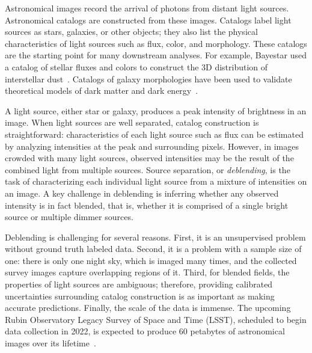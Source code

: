 Astronomical images record the arrival of photons from distant light sources. 
Astronomical catalogs are constructed from these images.
Catalogs label light sources as stars, galaxies, or other objects; they also list the physical characteristics of light sources such as flux, color, and morphology. 
These catalogs are the starting point for many downstream analyses.
For example, Bayestar used a catalog of stellar fluxes and colors to construct the 3D distribution of interstellar dust~\cite{Green_2019_argonaut}. 
Catalogs of galaxy morphologies have been used to validate theoretical models of dark matter and dark energy~\cite{Abbott2018}. 

A light source, either star or galaxy, produces a peak intensity of brightness in an image. 
When light sources are well separated, catalog construction is straightforward: characteristics of each light source such as flux can be estimated by analyzing intensities at the peak and surrounding pixels. 
However, in images crowded with many light sources, observed intensities may be the result of the combined light from multiple sources.
Source separation, or {\itshape deblending}, is the task of characterizing each individual light source from a mixture of intensities on an image. 
A key challenge in deblending is inferring whether any observed intensity is in fact blended, that is, whether it is comprised of a single bright source or multiple dimmer sources. 


Deblending is challenging for several reasons.
First, it is an unsupervised problem without ground truth labeled data. 
Second, it is a problem with a sample size of one: there is only one night sky, which is imaged many times, and the collected survey images capture overlapping regions of it.
Third, for blended fields, the properties of light sources are ambiguous; therefore, providing calibrated uncertainties surrounding catalog construction is as important as making accurate predictions.
Finally, the scale of the data is immense. 
The upcoming Rubin Observatory Legacy Survey of Space and Time (LSST), scheduled to begin data collection in 2022, is expected to produce 60 petabytes of astronomical images over its lifetime~\cite{LSST_about}.

